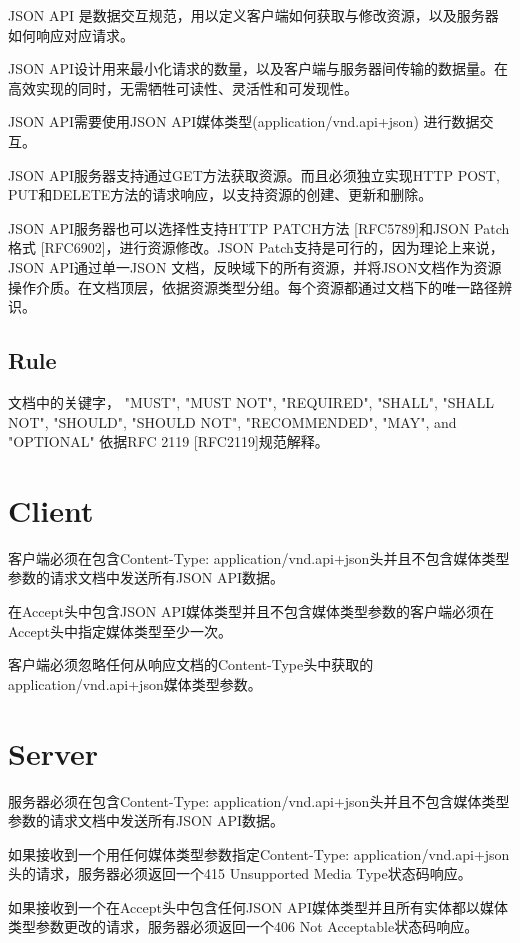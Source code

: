 JSON API 是数据交互规范，用以定义客户端如何获取与修改资源，以及服务器如何响应对应请求。

JSON API设计用来最小化请求的数量，以及客户端与服务器间传输的数据量。在高效实现的同时，无需牺牲可读性、灵活性和可发现性。

JSON API需要使用JSON API媒体类型(application/vnd.api+json) 进行数据交互。

JSON API服务器支持通过GET方法获取资源。而且必须独立实现HTTP POST, PUT和DELETE方法的请求响应，以支持资源的创建、更新和删除。

JSON API服务器也可以选择性支持HTTP PATCH方法 [RFC5789]和JSON Patch格式 [RFC6902]，进行资源修改。JSON Patch支持是可行的，因为理论上来说，JSON API通过单一JSON 文档，反映域下的所有资源，并将JSON文档作为资源操作介质。在文档顶层，依据资源类型分组。每个资源都通过文档下的唯一路径辨识。

\subsection{Rule}

文档中的关键字， "MUST", "MUST NOT", "REQUIRED", "SHALL", "SHALL NOT", "SHOULD", "SHOULD NOT", "RECOMMENDED", "MAY", and "OPTIONAL" 依据RFC 2119 [RFC2119]规范解释。

\section{Client}

客户端必须在包含Content-Type: application/vnd.api+json头并且不包含媒体类型参数的请求文档中发送所有JSON API数据。

在Accept头中包含JSON API媒体类型并且不包含媒体类型参数的客户端必须在Accept头中指定媒体类型至少一次。

客户端必须忽略任何从响应文档的Content-Type头中获取的application/vnd.api+json媒体类型参数。

\section{Server}

服务器必须在包含Content-Type: application/vnd.api+json头并且不包含媒体类型参数的请求文档中发送所有JSON API数据。

如果接收到一个用任何媒体类型参数指定Content-Type: application/vnd.api+json头的请求，服务器必须返回一个415 Unsupported Media Type状态码响应。

如果接收到一个在Accept头中包含任何JSON API媒体类型并且所有实体都以媒体类型参数更改的请求，服务器必须返回一个406 Not Acceptable状态码响应。

